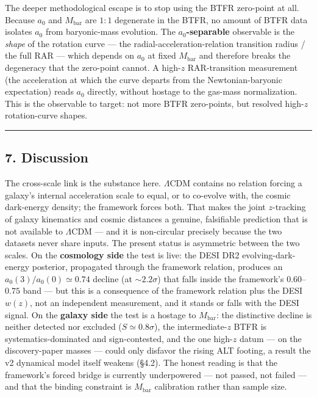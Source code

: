 \documentclass[
]{article}
\begin{document}
The deeper methodological escape is to stop using the BTFR zero-point at
all. Because \(a_0\) and \(M_\mathrm{bar}\) are \(1{:}1\) degenerate in the
BTFR, no amount of BTFR data isolates \(a_0\) from baryonic-mass
evolution. The \textbf{\(a_0\)-separable} observable is the \emph{shape}
of the rotation curve --- the radial-acceleration-relation transition
radius / the full RAR --- which depends on \(a_0\) at fixed
\(M_\mathrm{bar}\) and therefore breaks the degeneracy that the zero-point
cannot. A high-\(z\) RAR-transition measurement (the acceleration at
which the curve departs from the Newtonian-baryonic expectation) reads
\(a_0\) directly, without hostage to the gas-mass normalization. This is
the observable to target: not more BTFR zero-points, but resolved
high-\(z\) rotation-curve shapes.

\begin{center}\rule{0.5\linewidth}{0.5pt}\end{center}

\subsection{7. Discussion}\label{discussion}

The cross-scale link is the substance here. \(\Lambda\)CDM contains no
relation forcing a galaxy's internal acceleration scale to equal, or to
co-evolve with, the cosmic dark-energy density; the framework forces
both. That makes the joint \(z\)-tracking of galaxy kinematics and
cosmic distances a genuine, falsifiable prediction that is not available
to \(\Lambda\)CDM --- and it is non-circular precisely because the two
datasets never share inputs. The present status is asymmetric between
the two scales. On the \textbf{cosmology side} the test is live: the
DESI DR2 evolving-dark-energy posterior, propagated through the
framework relation, produces an \(a_0(3)/a_0(0)\simeq0.74\) decline (at
\(\sim2.2\sigma\)) that falls inside the framework's \(0.60\)--\(0.75\)
band --- but this is a consequence of the framework relation plus the
DESI \(w(z)\), not an independent measurement, and it stands or falls
with the DESI signal. On the \textbf{galaxy side} the test is a hostage
to \(M_\mathrm{bar}\): the distinctive decline is neither detected nor
excluded (\(S\simeq0.8\sigma\)), the intermediate-\(z\) BTFR is
systematics-dominated and sign-contested, and the one high-\(z\) datum
--- on the discovery-paper masses --- could only disfavor the rising ALT
footing, a result the v2 dynamical model itself weakens (§4.2). The
honest reading is that the framework's forced bridge is currently
underpowered --- not passed, not failed --- and that the binding
constraint is \(M_\mathrm{bar}\) calibration rather than sample size.
\end{document}
